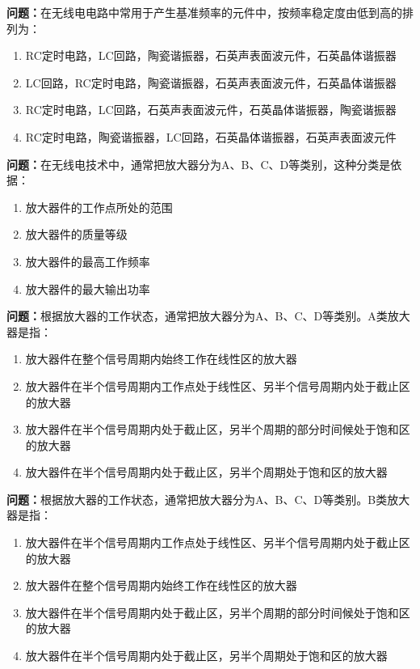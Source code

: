 \bigskip


\noindent\textbf{问题：}在无线电电路中常用于产生基准频率的元件中，按频率稳定度由低到高的排列为：
\begin{enumerate}[label=\Alph*), leftmargin=3em]
\item RC定时电路，LC回路，陶瓷谐振器，石英声表面波元件，石英晶体谐振器
\item LC回路，RC定时电路，陶瓷谐振器，石英声表面波元件，石英晶体谐振器
\item RC定时电路，LC回路，石英声表面波元件，石英晶体谐振器，陶瓷谐振器
\item RC定时电路，陶瓷谐振器，LC回路，石英晶体谐振器，石英声表面波元件
\end{enumerate}

\bigskip


\noindent\textbf{问题：}在无线电技术中，通常把放大器分为A、B、C、D等类别，这种分类是依据：
\begin{enumerate}[label=\Alph*), leftmargin=3em]
\item 放大器件的工作点所处的范围
\item 放大器件的质量等级
\item 放大器件的最高工作频率
\item 放大器件的最大输出功率
\end{enumerate}

\bigskip


\noindent\textbf{问题：}根据放大器的工作状态，通常把放大器分为A、B、C、D等类别。A类放大器是指：
\begin{enumerate}[label=\Alph*), leftmargin=3em]
\item 放大器件在整个信号周期内始终工作在线性区的放大器
\item 放大器件在半个信号周期内工作点处于线性区、另半个信号周期内处于截止区的放大器
\item 放大器件在半个信号周期内处于截止区，另半个周期的部分时间候处于饱和区的放大器
\item 放大器件在半个信号周期内处于截止区，另半个周期处于饱和区的放大器
\end{enumerate}

\bigskip


\noindent\textbf{问题：}根据放大器的工作状态，通常把放大器分为A、B、C、D等类别。B类放大器是指：
\begin{enumerate}[label=\Alph*), leftmargin=3em]
\item 放大器件在半个信号周期内工作点处于线性区、另半个信号周期内处于截止区的放大器
\item 放大器件在整个信号周期内始终工作在线性区的放大器
\item 放大器件在半个信号周期内处于截止区，另半个周期的部分时间候处于饱和区的放大器
\item 放大器件在半个信号周期内处于截止区，另半个周期处于饱和区的放大器
\end{enumerate}

